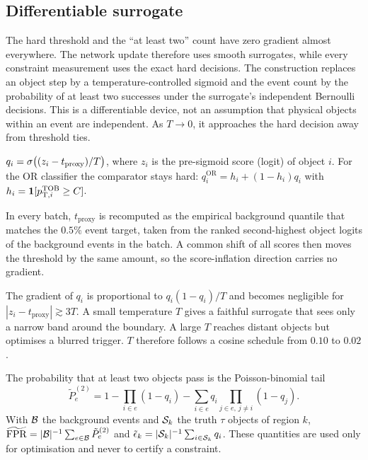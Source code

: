 \subsection{Differentiable surrogate}
The hard threshold and the ``at least two'' count have zero gradient almost everywhere. The network update therefore uses smooth surrogates, while every constraint measurement uses the exact hard decisions.
The construction replaces an object step by a temperature-controlled sigmoid and the event count by the probability of at least two successes under the surrogate's independent Bernoulli decisions. This is a differentiable device, not an assumption that physical objects within an event are independent. As $T\to0$, it approaches the hard decision away from threshold ties.
\begin{description}[leftmargin=0pt,itemsep=2pt]
  \item[Soft object decision.] $q_i=\sigma\big((z_i-t_{\mathrm{proxy}})/T\big)$, where $z_i$ is the pre-sigmoid score (logit) of object $i$. For the OR classifier the comparator stays hard: $q_i^{\mathrm{OR}}=h_i+(1-h_i)q_i$ with $h_i=\mathbf{1}[p_{\mathrm{T},i}^{\mathrm{TOB}}\geq C]$.
  \item[Rank-calibrated proxy threshold.] In every batch, $t_{\mathrm{proxy}}$ is recomputed as the empirical background quantile that matches the $0.5\%$ event target, taken from the ranked second-highest object logits of the background events in the batch. A common shift of all scores then moves the threshold by the same amount, so the score-inflation direction carries no gradient.
  \item[Temperature annealing.] The gradient of $q_i$ is proportional to $q_i(1-q_i)/T$ and becomes negligible for $|z_i-t_{\mathrm{proxy}}|\gtrsim3T$. A small temperature $T$ gives a faithful surrogate that sees only a narrow band around the boundary. A large $T$ reaches distant objects but optimises a blurred trigger. $T$ therefore follows a cosine schedule from $0.10$ to $0.02$.
  \item[Event surrogate.] The probability that at least two objects pass is the Poisson-binomial tail
  \begin{equation}
    \tilde P_e^{(2)}=1-\prod_{i\in e}(1-q_i)-\sum_{i\in e}q_i\prod_{j\in e,\,j\neq i}(1-q_j).
    \label{eq:surrogates}
  \end{equation}
  With $\mathcal{B}$ the background events and $\mathcal{S}_k$ the truth $\tau$ objects of region $k$, $\widetilde{\mathrm{FPR}}=|\mathcal{B}|^{-1}\sum_{e\in\mathcal{B}}\tilde P_e^{(2)}$ and $\tilde{\epsilon}_k=|\mathcal{S}_k|^{-1}\sum_{i\in\mathcal{S}_k}q_i$. These quantities are used only for optimisation and never to certify a constraint.
\end{description}

